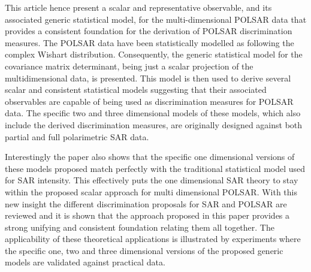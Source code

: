 \documentclass[journal]{IEEEtran}
\begin{document}
This article hence present a scalar and representative observable, and its associated generic statistical model,
  for the multi-dimensional POLSAR data that provides a consistent foundation for the derivation of POLSAR discrimination measures.
The POLSAR data have been statistically modelled as following the complex Wishart distribution.
Consequently, the generic statistical model for the covariance matrix determinant, being just a scalar projection of the multidimensional data, is presented.
This model is then used to derive several scalar and consistent statistical models suggesting that their associated observables are capable of being used as discrimination measures for POLSAR data.
The specific two and three dimensional models of these models, 
  which also include the derived discrimination measures,
  are originally designed against both partial and full polarimetric SAR data.

Interestingly the paper also shows that %
  the specific one dimensional versions of these models proposed 
  match perfectly with the traditional statistical model used for SAR intensity.
This effectively puts the one dimensional SAR theory to stay within the proposed scalar approach for multi dimensional POLSAR.
With this new insight the different discrimination proposals for SAR and POLSAR are reviewed and it is shown that the approach proposed in this paper provides a strong unifying and consistent foundation relating them all together.
The applicability of these theoretical applications is illustrated by experiments where the specific one, two and three dimensional versions of the proposed generic models are validated against practical data. 
\end{document}
